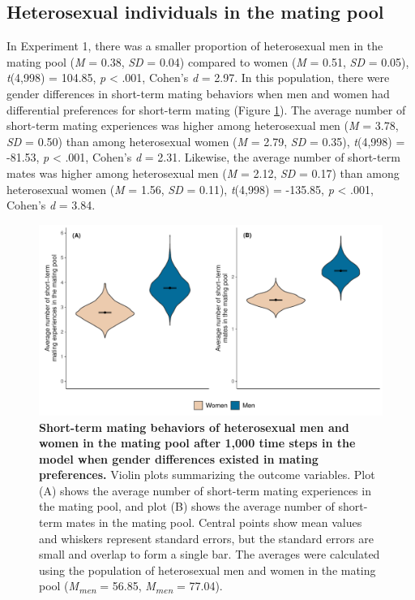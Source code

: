 \documentclass[
  11pt,
]{article}
\begin{document}
\hypertarget{heterosexual-individuals-in-the-mating-pool}{%
\subsection{Heterosexual individuals in the mating
pool}\label{heterosexual-individuals-in-the-mating-pool}}

In Experiment 1, there was a smaller proportion of heterosexual men in
the mating pool (\emph{M} = 0.38, \emph{SD} = 0.04) compared to women
(\emph{M} = 0.51, \emph{SD} = 0.05), \emph{t}(4,998) = 104.85, \emph{p}
\textless{} .001, Cohen's \emph{d} = 2.97. In this population, there
were gender differences in short-term mating behaviors when men and
women had differential preferences for short-term mating (Figure
\ref{fig:men_vs_women_inpool}). The average number of short-term mating
experiences was higher among heterosexual men (\emph{M} = 3.78,
\emph{SD} = 0.50) than among heterosexual women (\emph{M} = 2.79,
\emph{SD} = 0.35), \emph{t}(4,998) = -81.53, \emph{p} \textless{} .001,
Cohen's \emph{d} = 2.31. Likewise, the average number of short-term
mates was higher among heterosexual men (\emph{M} = 2.12, \emph{SD} =
0.17) than among heterosexual women (\emph{M} = 1.56, \emph{SD} = 0.11),
\emph{t}(4,998) = -135.85, \emph{p} \textless{} .001, Cohen's \emph{d} =
3.84.

\begin{figure}[h]
  \centering
  \includegraphics[width=0.8\columnwidth]{figures/fig2_men_vs_women_inpool.pdf}
  \caption{\textbf{Short-term mating behaviors of heterosexual men and women in the mating pool after 1,000 time steps in the model when gender differences existed in mating preferences.} Violin plots summarizing the outcome variables. Plot (A) shows the average number of short-term mating experiences in the mating pool, and plot (B) shows the average number of short-term mates in the mating pool. Central points show mean values and whiskers represent standard errors, but the standard errors are small and overlap to form a single bar. The averages were calculated using the population of heterosexual men and women in the mating pool (\textit{M\textsubscript{men}} = 56.85, \textit{M\textsubscript{men}} = 77.04).}
  \label{fig:men_vs_women_inpool}
\end{figure}
\end{document}

